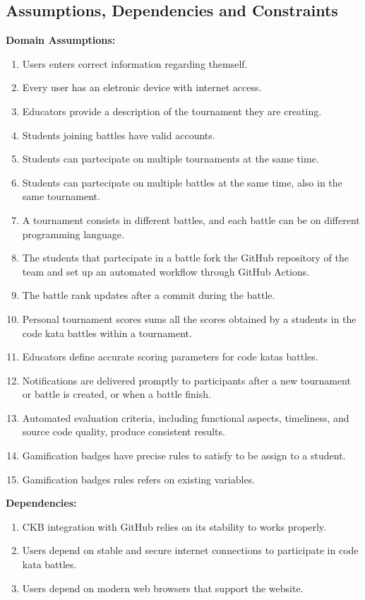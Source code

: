 \documentclass[a4paper, 11pt, titlepage]{article}
\begin{document}
\subsection{Assumptions, Dependencies and Constraints}
\textbf{Domain Assumptions:}
\begin{enumerate}[label=D\arabic*:, align=left, leftmargin=*]
    \item Users enters correct information regarding themself.
    \item Every user has an eletronic device with internet access.
    \item Educators provide a description of the tournament they are creating.
    \item Students joining battles have valid accounts.
    \item Students can partecipate on multiple tournaments at the same time.
    \item Students can partecipate on multiple battles at the same time, also in the same tournament.
    \item A tournament consists in different battles, and each battle can be on different programming language.
    \item The students that partecipate in a battle fork the GitHub repository of the team and set up an automated workflow through GitHub Actions.
    \item The battle rank updates after a commit during the battle.
    \item Personal tournament scores sums all the scores obtained by a students in the code kata battles within a tournament.
    \item Educators define accurate scoring parameters for code katas battles.
    \item Notifications are delivered promptly to participants after a new tournament or battle is created, or when a battle finish.
    \item Automated evaluation criteria, including functional aspects, timeliness, and source code quality, produce consistent results.
    \item Gamification badges have precise rules to satisfy to be assign to a student.
    \item Gamification badges rules refers on existing variables.
\end{enumerate}
\textbf{Dependencies:}
\begin{enumerate}[label=De\arabic*:, align=left, leftmargin=*]
    \item CKB integration with GitHub relies on its stability to works properly.
    \item Users depend on stable and secure internet connections to participate in code kata battles.
    \item Users depend on modern web browsers that support the website.
\end{enumerate}
\end{document}
